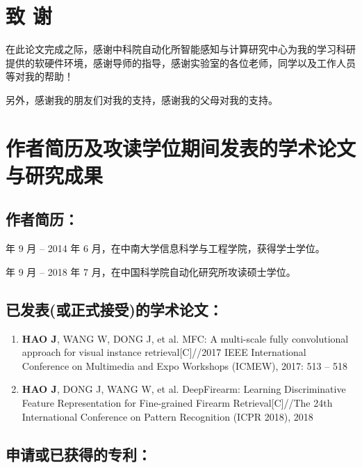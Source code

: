 
\chapter{致 \quad 谢}
在此论文完成之际，感谢中科院自动化所智能感知与计算研究中心为我的学习科研提供的软硬件环境，感谢导师的指导，感谢实验室的各位老师，同学以及工作人员等对我的帮助！

另外，感谢我的朋友们对我的支持，感谢我的父母对我的支持。

\chapter{作者简历及攻读学位期间发表的学术论文与研究成果}

\section*{作者简历：}

 年 9 月 -- 2014 年 6 月，在中南大学信息科学与工程学院，获得学士学位。

 年 9 月 -- 2018 年 7 月，在中国科学院自动化研究所攻读硕士学位。

\section*{已发表(或正式接受)的学术论文：}

\begin{enumerate}

	\item \textbf{HAO J}, WANG W, DONG J, et al. MFC: A multi-scale fully convolutional approach for visual instance retrieval[C]//2017 IEEE International Conference on Multimedia and Expo Workshops (ICMEW), 2017: 513 -- 518

	\item \textbf{HAO J}, DONG J, WANG W, et al. DeepFirearm: Learning Discriminative Feature Representation for Fine-grained Firearm Retrieval[C]//The 24th International Conference on Pattern Recognition (ICPR 2018), 2018
\end{enumerate}

\section*{申请或已获得的专利：}

